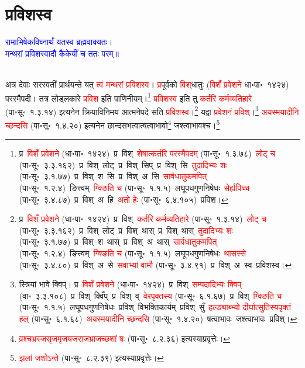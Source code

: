 \section[प्रविशस्व]{प्रविशस्व}
\centering\textcolor{blue}{रामाभिषेकविघ्नार्थं यतस्व ब्रह्मवाक्यतः।\nopagebreak\\
मन्थरां प्रविशस्वादौ कैकेयीं च ततः परम्॥}\nopagebreak\\
\\
\fontsize{14}{21}\selectfont\begin{sloppypar}\justifying\noindent\hspace{10mm} अत्र देवाः सरस्वतीं प्रार्थयन्ते यत् \textcolor{red}{त्वं मन्थरां प्रविशस्व}। \textcolor{red}{प्र}\-पूर्वको \textcolor{red}{विश्‌}\-धातुः (\textcolor{red}{विशँ प्रवेशने} धा॰पा॰~१४२४) परस्मैपदी। तत्र लोड्लकारे \textcolor{red}{प्रविश} इति पाणिनीयम्।\footnote{प्र~\textcolor{red}{विशँ प्रवेशने} (धा॰पा॰~१४२४)~\arrow प्र~विश्~\arrow \textcolor{red}{शेषात्कर्तरि परस्मैपदम्} (पा॰सू॰~१.३.७८)~\arrow \textcolor{red}{लोट् च} (पा॰सू॰~३.३.१६२)~\arrow प्र~विश्~लोट्~\arrow प्र~विश्~सिप्~\arrow प्र~विश्~सि~\arrow \textcolor{red}{तुदादिभ्यः शः} (पा॰सू॰~३.१.७७)~\arrow प्र~विश्~श~सि~\arrow प्र~विश्~अ~सि~\arrow \textcolor{red}{सार्वधातुकमपित्} (पा॰सू॰~१.२.४)~\arrow ङित्त्वम्~\arrow \textcolor{red}{ग्क्ङिति च} (पा॰सू॰~१.१.५)~\arrow लघूपध\-गुण\-निषेधः~\arrow \textcolor{red}{सेर्ह्यपिच्च} (पा॰सू॰~३.४.८७)~\arrow प्र~विश्~अ~हि~\arrow \textcolor{red}{अतो हेः} (पा॰सू॰~६.४.१०५)~\arrow प्रविश।} \textcolor{red}{प्रविशस्व} इति तु \textcolor{red}{कर्तरि कर्म\-व्यतिहारे} (पा॰सू॰~१.३.१४) इत्यनेन क्रिया\-विनिमय आत्मनेपदे सति \textcolor{red}{प्रविशस्व}।\footnote{प्र~\textcolor{red}{विशँ प्रवेशने} (धा॰पा॰~१४२४)~\arrow प्र~विश्~\arrow \textcolor{red}{कर्तरि कर्मव्यतिहारे} (पा॰सू॰~१.३.१४)~\arrow \textcolor{red}{लोट् च} (पा॰सू॰~३.३.१६२)~\arrow प्र~विश्~लोट्~\arrow प्र~विश्~थास्~\arrow प्र~विश्~थास्~\arrow \textcolor{red}{तुदादिभ्यः शः} (पा॰सू॰~३.१.७७)~\arrow प्र~विश्~श~थास्~\arrow प्र~विश्~अ~थास्~\arrow \textcolor{red}{सार्वधातुकमपित्} (पा॰सू॰~१.२.४)~\arrow ङित्त्वम्~\arrow \textcolor{red}{ग्क्ङिति च} (पा॰सू॰~१.१.५)~\arrow लघूपध\-गुण\-निषेधः~\arrow \textcolor{red}{थासस्से} (पा॰सू॰~३.४.८०)~\arrow प्र~विश्~अ~से~\arrow \textcolor{red}{सवाभ्यां वामौ} (पा॰सू॰~३.४.९१)~\arrow प्र~विश्~अ~स्व~\arrow प्रविशस्व।} 
यद्वा \textcolor{red}{प्रवेशनं प्रविश्}।\footnote{स्त्रियां भावे क्विप्। प्र~\textcolor{red}{विशँ प्रवेशने} (धा॰पा॰~१४२४)~\arrow प्र~विश्~\arrow \textcolor{red}{सम्पदादिभ्‍यः क्विप्} (वा॰~३.३.१०८)~\arrow प्र~विश्~क्विँप्~\arrow प्र~विश्~व्~\arrow \textcolor{red}{वेरपृक्तस्य} (पा॰सू॰~६.१.६७)~\arrow प्र~विश्~\arrow \textcolor{red}{ग्क्ङिति च} (पा॰सू॰~१.१.५)~\arrow लघूपध\-गुण\-निषेधः~\arrow प्रविश्~\arrow विभक्ति\-कार्यम्~\arrow प्रविश्~सुँ~\arrow \textcolor{red}{हल्ङ्याब्भ्यो दीर्घात्सुतिस्यपृक्तं हल्} (पा॰सू॰~६.१.६८)~\arrow \textcolor{red}{अयस्मयादीनि च्छन्दसि} (पा॰सू॰~१.४.२०)~\arrow षत्वाभावः~\arrow जश्त्वाभावः~\arrow प्रविश्।} \textcolor{red}{अयस्मयादीनि च्छन्दसि} (पा॰सू॰~१.४.२०) इत्यनेन छान्दस\-भत्वात्षत्वाभावो\footnote{\textcolor{red}{व्रश्चभ्रस्ज\-सृजमृज\-यजराज\-भ्राजच्छशां षः} (पा॰सू॰~८.२.३६) इत्यस्याप्रवृत्तेः।} जश्त्वाभावश्च।\footnote{\textcolor{red}{झलां जशोऽन्ते} (पा॰सू॰~८.२.३९) इत्यस्याप्रवृत्तेः।}

\end{sloppypar}
